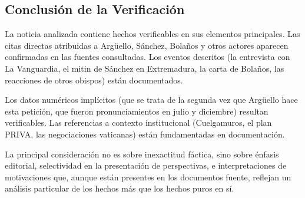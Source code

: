 \documentclass[10pt,a4paper]{article}
\begin{document}
\subsection*{Conclusi\'{o}n de la Verificaci\'{o}n}

 La noticia analizada contiene hechos verificables en sus elementos principales. Las citas directas atribuidas a Arg\"{u}ello, S\'{a}nchez, Bola\~{n}os y otros actores aparecen confirmadas en las fuentes consultadas. Los eventos descritos (la entrevista con La Vanguardia, el mitin de S\'{a}nchez en Extremadura, la carta de Bola\~{n}os, las reacciones de otros obispos) est\'{a}n documentados. 
\par\medskip
Los datos num\'{e}ricos impl\'{i}citos (que se trata de la segunda vez que Arg\"{u}ello hace esta petici\'{o}n, que fueron pronunciamientos en julio y diciembre) resultan verificables. Las referencias a contexto institucional (Cuelgamuros, el plan PRIVA, las negociaciones vaticanas) est\'{a}n fundamentadas en documentaci\'{o}n.
\par\medskip
La principal consideraci\'{o}n no es sobre inexactitud f\'{a}ctica, sino sobre \'{e}nfasis editorial, selectividad en la presentaci\'{o}n de perspectivas, e interpretaciones de motivaciones que, aunque est\'{a}n presentes en los documentos fuente, reflejan un an\'{a}lisis particular de los hechos m\'{a}s que los hechos puros en s\'{i}.
\par\medskip
[1][2][3][4][5][6][7][8][9][10][11][12][13][14][15][16][17][18][19][20][21][22][23][24][25][26][27][28][29][30][31][32]
\vspace{1em}

\end{document}
